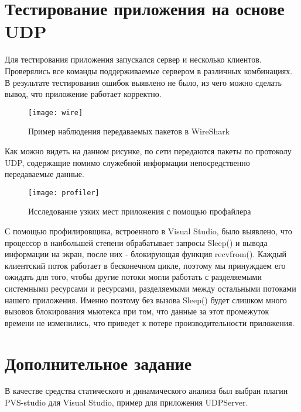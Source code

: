 \section{Тестирование приложения на основе UDP}

Для тестирования приложения запускался сервер и несколько клиентов. Проверялись все команды поддерживаемые сервером в различных комбинациях.
	В результате тестирования ошибок выявлено не было, из чего можно сделать вывод, что приложение работает корректно.

\begin{figure}[H]
	\begin{center}
		\texttt{[image: wire]}
		\caption{Пример наблюдения передаваемых пакетов в WireShark} 
		\label{pic:wire} %
	\end{center}
\end{figure}

Как можно видеть на данном рисунке, по сети передаются пакеты по протоколу UDP, содержащие помимо служебной информации непосредственно передаваемые данные.

\begin{figure}[H]
	\begin{center}
		\texttt{[image: profiler]}
		\caption{Исследование узких мест приложения с помощью профайлера} 
		\label{pic:profiler} %
	\end{center}
\end{figure}

С помощью профилировщика, встроенного в Visual Studio, было выявлено, что процессор в наибольшей степени обрабатывает запросы Sleep() и вывода информации на экран, после них - блокирующая функция recvfrom(). 
Каждый клиентский поток работает в бесконечном цикле, поэтому мы принуждаем его ожидать для того, чтобы другие потоки могли работать с разделяемыми системными ресурсами и ресурсами, разделяемыми между остальными потоками нашего приложения. Именно поэтому без вызова Sleep() будет слишком много вызовов блокирования мьютекса при том, что данные за этот промежуток времени не изменились, что приведет к потере производительности приложения.

\section{Дополнительное задание}

В качестве средства статического и динамического анализа был выбран плагин PVS-studio для Visual Studio, пример для приложения UDPServer.

